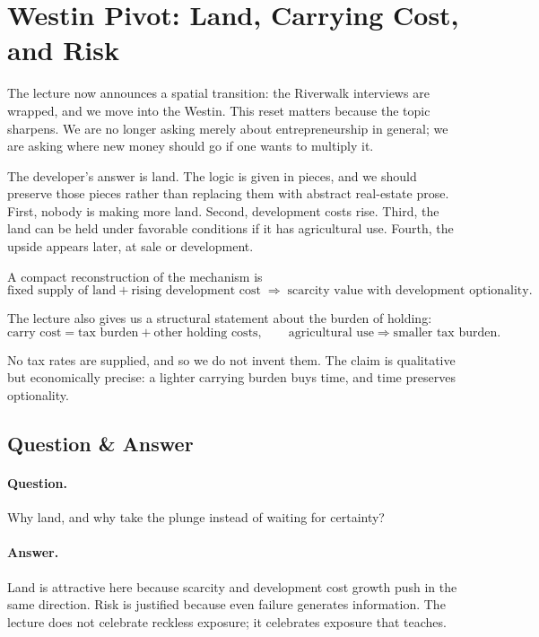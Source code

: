 \section{Westin Pivot: Land, Carrying Cost, and Risk}

The lecture now announces a spatial transition: the Riverwalk interviews are wrapped, and we move into the Westin. This reset matters because the topic sharpens. We are no longer asking merely about entrepreneurship in general; we are asking where new money should go if one wants to multiply it.

The developer's answer is land. The logic is given in pieces, and we should preserve those pieces rather than replacing them with abstract real-estate prose. First, nobody is making more land. Second, development costs rise. Third, the land can be held under favorable conditions if it has agricultural use. Fourth, the upside appears later, at sale or development.

A compact reconstruction of the mechanism is
\begin{equation}
\text{fixed supply of land} + \text{rising development cost}
\;\Longrightarrow\;
\text{scarcity value with development optionality}.
\end{equation}

The lecture also gives us a structural statement about the burden of holding:
\begin{equation}
\text{carry cost} = \text{tax burden} + \text{other holding costs},
\qquad
\text{agricultural use} \Rightarrow \text{smaller tax burden}.
\end{equation}

No tax rates are supplied, and so we do not invent them. The claim is qualitative but economically precise: a lighter carrying burden buys time, and time preserves optionality.

\subsection{Question \& Answer}

\paragraph{Question.} Why land, and why take the plunge instead of waiting for certainty?

\paragraph{Answer.} Land is attractive here because scarcity and development cost growth push in the same direction. Risk is justified because even failure generates information. The lecture does not celebrate reckless exposure; it celebrates exposure that teaches.


